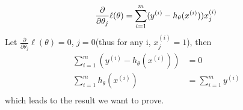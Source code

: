 \begin{answer}
    $$
        \frac{\partial}{\partial \theta_j} \ell(\theta) = \sum_{i=1}^m (y^{(i)} - h_\theta(x^{(i)}))x^{(i)}_j \\
    $$  
    Let $\frac{\partial}{\partial \theta_j} \ell(\theta) = 0$, $j = 0$(thus for any i, $x^{(i)}_j = 1$), then
    $$
    \begin{aligned}
        \sum_{i = 1}^m (y^{(i)} - h_\theta(x^{(i)})) &= 0 \\
        \sum_{i = 1}^m h_\theta(x^{(i)}) &= \sum_{i = 1}^m y^{(i)} \\
    \end{aligned}
    $$ 
    which leads to the result we want to prove.
\end{answer}
